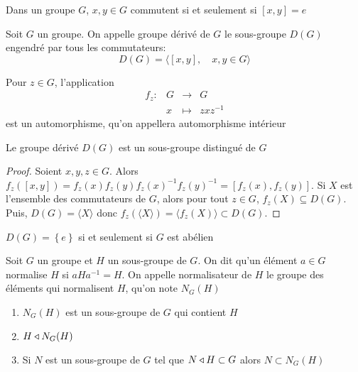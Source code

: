 \begin{rem}
    Dans un groupe $G$,  $x, y \in G$ commutent si et seulement si $[x, y]=e$
\end{rem}

\begin{dfn}
    Soit $G$ un groupe. On appelle groupe dérivé de  $G$ le sous-groupe $D(G)$ engendré par tous les commutateurs:  \[
        D(G) = \langle [x, y], \quad x,y \in  G\rangle
    \] 
\end{dfn}

\begin{defprop}
Pour $z \in  G$, l'application \[
\begin{array}{rrcl}
    f_z:& G & \longrightarrow & G \\
    & x & \longmapsto & \displaystyle zxz^{-1}
\end{array}
\] 
est un automorphisme, qu'on appellera automorphisme intérieur
\end{defprop}

\begin{prop}
   Le groupe dérivé $D(G)$ est un sous-groupe distingué de  $G$
\end{prop}

\begin{proof}
    Soient $x, y, z\in  G$. Alors $f_z([x, y])=f_z(x)f_z(y)f_z(x)^{-1}f_z(y)^{-1}=[f_z(x), f_z(y)]$. Si $X$ est l'ensemble des commutateurs de  $G$, alors pour tout  $z \in  G$, $f_z(X)\subseteq D(G)$. Puis,  $D(G) = \langle X\rangle$ donc  $f_z(\langle X\rangle)=\langle f_z(X)\rangle\subset D(G)$.
\end{proof}

\begin{rem}
    $D(G) = \left\{ e \right\} $ si et seulement si $G$ est abélien
\end{rem}

\begin{dfn}[Normalisateur]
    Soit $G$ un groupe et  $H$ un sous-groupe de  $G$. On dit qu'un élément  $a \in  G$ normalise $H$ si  $aHa^{-1}=H$. On appelle normalisateur de $H$ le groupe des éléments qui normalisent  $H$, qu'on note  $N_G(H)$
\end{dfn}

\begin{prop}
\begin{enumerate}
    \item $N_G(H)$ est un sous-groupe de  $G$ qui contient  $H$
    \item  $H\triangleleft N_G(H)$
    \item Si  $N$ est un sous-groupe de  $G$ tel que  $N\triangleleft H\subset G$ alors  $N\subset N_G(H)$
\end{enumerate}
\end{prop}

